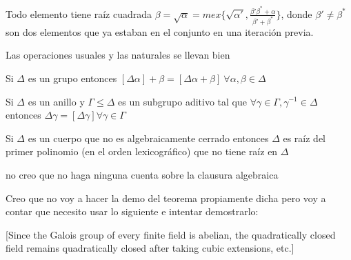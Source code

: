 \documentclass[10pt,spanish]{beamer}
\def\m{^{-1}}
\begin{document}
\begin{frame}{Todo elemento tiene raíz cuadrada}
	$\beta = \sqrt{\alpha} = mex \{\sqrt{\alpha'}, \frac{\beta'\beta^* + \alpha}{\beta'+\beta^*}\}$, donde $\beta'\neq \beta^*$ son dos elementos que ya estaban en el conjunto en una iteración previa.
\end{frame}

\begin{frame}{Las operaciones usuales y las naturales se llevan bien}


\begin{theorem}
	Si $\Delta$ es un grupo entonces $[\Delta\alpha] + \beta = [\Delta\alpha+\beta]\ \forall \alpha,\beta\in\Delta$
\end{theorem}

\begin{theorem}
	Si $\Delta$ es un anillo y $\Gamma \leq \Delta$ es un subgrupo aditivo tal que $\forall \gamma\in \Gamma, \gamma\m \in \Delta$ entonces $\Delta\gamma = [\Delta\gamma] \forall\gamma\in\Gamma$
\end{theorem}
\end{frame}


\begin{frame}
	\begin{theorem}
		Si $\Delta$ es un cuerpo que no es algebraicamente cerrado entonces $\Delta$ es raíz del primer polinomio (en el orden lexicográfico) que no tiene raíz en $\Delta$
	\end{theorem}
\end{frame}

\begin{frame}{no creo que no haga ninguna cuenta sobre la clausura algebraica}
\end{frame}



\begin{frame}
Creo que no voy a hacer la demo del teorema propiamente dicha pero voy a contar que necesito usar lo siguiente e intentar demostrarlo:

[Since the Galois group of every finite field is abelian, the quadratically
closed field remains quadratically closed after taking cubic extensions, etc.]	


\end{frame}
\end{document}
